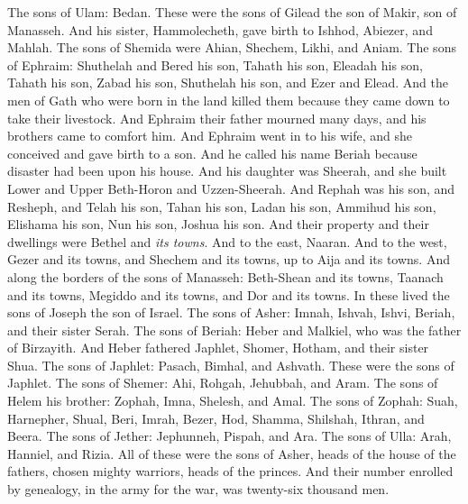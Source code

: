 \begin{biblechapter}
\verse The sons of Ulam: Bedan. These were the sons of Gilead the son of Makir, son of Manasseh.
\verse And his sister, Hammolecheth, gave birth to Ishhod, Abiezer, and Mahlah.
\verse The sons of Shemida were Ahian, Shechem, Likhi, and Aniam.
 The sons of Ephraim: Shuthelah and Bered his son, Tahath his son, Eleadah his son, Tahath his son,
\verse Zabad his son, Shuthelah his son, and Ezer and Elead. And the men of Gath who were born in the land killed them because they came down to take their livestock.
\verse And Ephraim their father mourned many days, and his brothers came to comfort him.
\verse And Ephraim went in to his wife, and she conceived and gave birth to a son. And he called his name Beriah because disaster had been upon his house.
\verse And his daughter was Sheerah, and she built Lower and Upper Beth-Horon and Uzzen-Sheerah.
\verse And Rephah was his son, and Resheph, and Telah his son, Tahan his son,
\verse Ladan his son, Ammihud his son, Elishama his son,
\verse Nun his son, Joshua his son.
\verse And their property and their dwellings were Bethel and \textit{its towns}. And to the east, Naaran. And to the west, Gezer and its towns, and Shechem and its towns, up to Aija and its towns.
\verse And along the borders of the sons of Manasseh: Beth-Shean and its towns, Taanach and its towns, Megiddo and its towns, and Dor and its towns. In these lived the sons of Joseph the son of Israel.
 The sons of Asher: Imnah, Ishvah, Ishvi, Beriah, and their sister Serah.
\verse The sons of Beriah: Heber and Malkiel, who was the father of Birzayith.
\verse And Heber fathered Japhlet, Shomer, Hotham, and their sister Shua.
\verse The sons of Japhlet: Pasach, Bimhal, and Ashvath. These were the sons of Japhlet.
\verse The sons of Shemer: Ahi, Rohgah, Jehubbah, and Aram.
\verse The sons of Helem his brother: Zophah, Imna, Shelesh, and Amal.
\verse The sons of Zophah: Suah, Harnepher, Shual, Beri, Imrah,
\verse Bezer, Hod, Shamma, Shilshah, Ithran, and Beera.
\verse The sons of Jether: Jephunneh, Pispah, and Ara.
\verse The sons of Ulla: Arah, Hanniel, and Rizia.
\verse All of these were the sons of Asher, heads of the house of the fathers, chosen mighty warriors, heads of the princes. And their number enrolled by genealogy, in the army for the war, was twenty-six thousand men.
\end{biblechapter}

